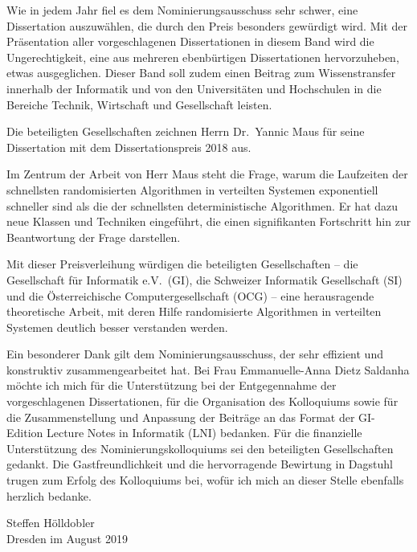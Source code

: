 \documentclass{lni}
\begin{document}
Wie in jedem Jahr fiel es dem Nominierungsausschuss sehr schwer, eine Dissertation auszuw{\"a}hlen, die durch den Preis besonders gew{\"u}rdigt wird. Mit
der Pr{\"a}sentation aller vorgeschlagenen Dissertationen in diesem Band wird die
Ungerechtigkeit, eine aus mehreren ebenb{\"u}rtigen Dissertationen hervorzuheben,
etwas ausgeglichen. Dieser Band soll zudem einen Beitrag zum Wissenstransfer
innerhalb der Informatik und von den Universit{\"a}ten und Hochschulen in die
Bereiche Technik, Wirtschaft und Gesellschaft leisten.

Die beteiligten Gesellschaften zeichnen Herrn  Dr.~Yannic Maus f{\"u}r seine Dissertation  mit dem Dissertationspreis 2018 aus. 


Im Zentrum der Arbeit von Herr Maus steht die Frage, warum die Laufzeiten der schnellsten randomisierten Algorithmen in verteilten Systemen exponentiell schneller sind als die der schnellsten deterministische Algorithmen. Er hat dazu neue Klassen und Techniken eingef\"uhrt, die einen signifikanten Fortschritt hin zur Beantwortung der Frage darstellen.

Mit dieser Preisverleihung w{\"u}rdigen die beteiligten Gesellschaften -- die
Gesellschaft f{\"u}r Informatik e.V.\ (GI), die Schweizer Informatik Gesellschaft
(SI) und die {\"O}sterreichische Computergesellschaft (OCG) -- eine herausragende theoretische Arbeit, mit deren Hilfe randomisierte Algorithmen in verteilten Systemen deutlich besser verstanden werden.\bigskip

Ein besonderer Dank gilt dem Nominierungsausschuss, der sehr effizient
und konstruktiv zusammengearbeitet hat. Bei Frau Emmanuelle-Anna Dietz Saldanha
m{\"o}chte ich mich f{\"u}r die Unterst{\"u}tzung bei der Entgegennahme der
vorgeschlagenen Dissertationen, f{\"u}r die Organisation des Kolloquiums
sowie f{\"u}r die Zusammenstellung und Anpassung der Beitr{\"a}ge an das
Format der GI-Edition Lecture Notes in Informatik (LNI) bedanken. F{\"u}r
die finanzielle Unterst{\"u}tzung des Nominierungskolloquiums sei den
beteiligten Gesellschaften gedankt. Die Gastfreundlichkeit und die
hervorragende Bewirtung in Dagstuhl trugen zum Erfolg des Kolloquiums
bei, wof{\"u}r ich mich an dieser Stelle ebenfalls herzlich bedanke.

\bigskip

\noindent
\noindent
Steffen H{\"o}lldobler\\
Dresden im August  2019
\end{document}
